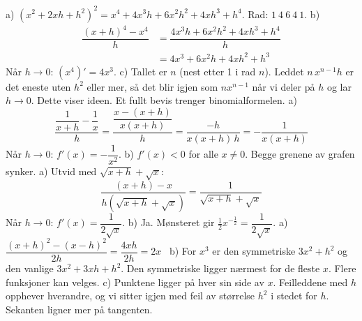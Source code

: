  a) $(x^2 + 2xh + h^2)^2 = x^4 + 4x^3h + 6x^2h^2 + 4xh^3 + h^4$. Rad: $1\ 4\ 6\ 4\ 1$.
b) \[ \begin{aligned} \dfrac{(x + h)^4 - x^4}{h} &= \dfrac{4x^3h + 6x^2h^2 + 4xh^3 + h^4}{h}\\ &= 4x^3 + 6x^2h + 4xh^2 + h^3 \end{aligned} \]
Når $h \to 0$: $(x^4)' = 4x^3$.
c) Tallet er $n$ (nest etter 1 i rad $n$). Leddet $n\,x^{n-1}h$ er det eneste uten $h^2$ eller mer, så det blir igjen som $nx^{n-1}$ når vi deler på $h$ og lar $h \to 0$. Dette viser ideen. Et fullt bevis trenger binomialformelen.
 a)
\[ \dfrac{\dfrac{1}{x + h} - \dfrac{1}{x}}{h} = \dfrac{\dfrac{x - (x + h)}{x(x + h)}}{h} = \dfrac{-h}{x(x + h)\,h} = -\dfrac{1}{x(x + h)} \]
Når $h \to 0$: $f'(x) = -\dfrac{1}{x^2}$.
b) $f'(x) < 0$ for alle $x \neq 0$. Begge grenene av grafen synker.
 a) Utvid med $\sqrt{x + h} + \sqrt{x}$:
\[ \dfrac{(x + h) - x}{h\left(\sqrt{x + h} + \sqrt{x}\right)} = \dfrac{1}{\sqrt{x + h} + \sqrt{x}} \]
Når $h \to 0$: $f'(x) = \dfrac{1}{2\sqrt{x}}$.
b) Ja. Mønsteret gir $\frac{1}{2}x^{-\tfrac{1}{2}} = \dfrac{1}{2\sqrt{x}}$.
 a) $\dfrac{(x + h)^2 - (x - h)^2}{2h} = \dfrac{4xh}{2h} = 2x$ \ b) For $x^3$ er den symmetriske $3x^2 + h^2$ og den vanlige $3x^2 + 3xh + h^2$. Den symmetriske ligger nærmest for de fleste $x$. Flere funksjoner kan velges. c) Punktene ligger på hver sin side av $x$. Feilleddene med $h$ opphever hverandre, og vi sitter igjen med feil av størrelse $h^2$ i stedet for $h$. Sekanten ligner mer på tangenten.
